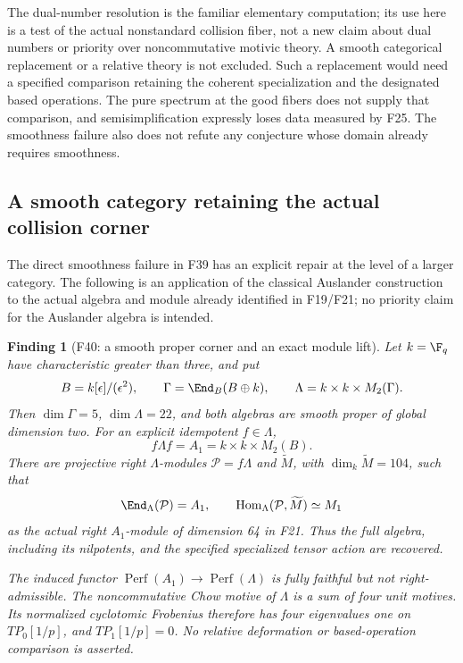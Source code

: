 \documentclass[11pt,a4paper]{article}
\newcommand{\fid}[1]{\textsf{#1}}\newcommand{\gate}[1]{\textsf{#1}}
\theoremstyle{named}\newtheorem{finding}{Finding}[section]
\theoremstyle{definition}\newtheorem{definition}[finding]{Definition}
\theoremstyle{remark}\newtheorem{remark}[finding]{Remark}
\begin{document}
The dual-number resolution is the familiar elementary computation;
its use here is a test of the actual nonstandard collision fiber,
not a new claim about dual numbers or priority over noncommutative
motivic theory. A smooth categorical replacement or a relative theory
is not excluded. Such a replacement would need a specified comparison
retaining the coherent specialization and the designated based
operations. The pure spectrum at the good fibers does not supply
that comparison, and semisimplification expressly loses data measured
by \fid{F25}. The smoothness failure also does not refute any
conjecture whose domain already requires smoothness.

\subsection{A smooth category retaining the actual collision corner}
The direct smoothness failure in \fid{F39} has an explicit repair
at the level of a larger category. The following is an application
of the classical Auslander construction to the actual algebra and
module already identified in \fid{F19}/\fid{F21}; no priority claim
for the Auslander algebra is intended.

\begin{finding}[\fid{F40}: a smooth proper corner and an exact module lift]\label{f:auslander}
Let $k=\F_q$ have characteristic greater than three, and put
\[
 B=k[\epsilon]/(\epsilon^2),\qquad
 \Gamma=\End_B(B\oplus k),\qquad
 \Lambda=k\times k\times M_2(\Gamma).
\]
Then $\dim\Gamma=5$, $\dim\Lambda=22$, and both algebras are
smooth proper of global dimension two. For an explicit idempotent
$f\in\Lambda$,
\[
 f\Lambda f=A_1=k\times k\times M_2(B).
\]
There are projective right $\Lambda$-modules
$\mathcal P=f\Lambda$ and $\widetilde M$, with
$\dim_k\widetilde M=104$, such that
\[
 \End_\Lambda(\mathcal P)=A_1,\qquad
 \operatorname{Hom}_\Lambda(\mathcal P,\widetilde M)
   \simeq M_1
\]
as the actual right $A_1$-module of dimension 64 in \fid{F21}.
Thus the full algebra, including its nilpotents, and the specified
specialized tensor action are recovered.

The induced functor
$\operatorname{Perf}(A_1)\to\operatorname{Perf}(\Lambda)$ is fully
faithful but not right-admissible. The noncommutative Chow motive
of $\Lambda$ is a sum of four unit motives. Its normalized
cyclotomic Frobenius therefore has four eigenvalues one on
$TP_0[1/p]$, and $TP_1[1/p]=0$.
No relative deformation or based-operation comparison is asserted.
\end{finding}
\end{document}
